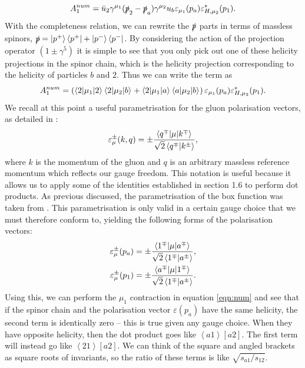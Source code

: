 \begin{equation}
A_1^{num} = \bar{u}_2 \gamma^{\mu_1}(\slashed{p}_2-\slashed{p}_a)\gamma^{\mu_2}u_b \varepsilon_{\mu_1}(p_a)\varepsilon^*_{H,\mu_2}(p_1).
\end{equation}
With the completeness relation, we can rewrite the $\slashed{p}$ parts in terms of massless spinors,  $\slashed{p} = \left| p^+ \right> \left<p^+ \right| + \left| p^- \right> \left<p^- \right|$. By considering the action of the projection operator $(1\pm \gamma^5)$ it is simple to see that you only pick out one of these helicity projections in the spinor chain, which is the helicity projection corresponding to the helicity of particles $b$ and $2$. Thus we can write the term as
\begin{equation}
A_1^{num} = \left(\mathinner{\langle2\vert\mu_1\vert2\rangle}_{}\mathinner{\langle2\vert\mu_2\vert b\rangle}_{} + \mathinner{\langle2\vert\mu_1\vert a\rangle}_{}\mathinner{\langle a\vert\mu_2\vert b\rangle}_{}\right)\varepsilon_{\mu_1}(p_a)\varepsilon^*_{H,\mu_2}(p_1).
\label{eqn:num}
\end{equation}
We recall at this point a useful parametrisation for the gluon polarisation vectors, as detailed in \cite{Dixon1996}:
\begin{equation}
\varepsilon_\mu^{\pm}(k,q) = \pm \frac{\mathinner{\langle q^\mp\vert\mu\vert k^\mp\rangle}_{}}{\sqrt{2} \left<q^\mp | k^\pm \right>},
\end{equation}
where $k$ is the momentum of the gluon and $q$ is an arbitrary massless reference momentum which reflects our gauge freedom. This notation is useful because it allows us to apply some of the identities established in section 1.6 to perform dot products. As previous discussed, the parametrisation of the box function was taken from \cite{Duca2003}. This parametrisation is only valid in a certain gauge choice that we must therefore conform to, yielding the following forms of the polarisation vectors:
\begin{equation}
\begin{split}
\varepsilon_\mu^{\pm}(p_a) &= \pm \frac{\mathinner{\langle1^\mp\vert\mu\vert a^\mp\rangle}_{}}{\sqrt{2} \left<1^\mp | a^\pm \right>}, \\
\varepsilon_\mu^{\pm}(p_1) &= \pm \frac{\mathinner{\langle a^\mp\vert\mu\vert1^\mp\rangle}_{}}{\sqrt{2} \left<1^\mp | a^\pm \right>}.
\end{split}
\end{equation}
Using this, we can perform the $\mu_1$ contraction in equation \ref{eqn:num} and see that if the spinor chain and the polarisation vector $\varepsilon(p_a)$ have the same helicity, the second term is identically zero -- this is true given any gauge choice. When they have opposite helicity, then the dot product goes like $\left<a 1 \right> [ a 2]$. The first term will instead go like $\left<2 1 \right>[a 2]$. We can think of the square and angled brackets as square roots of invariants, so the ratio of these terms is like $\sqrt{s_{a1}/s_{12}}$. 

